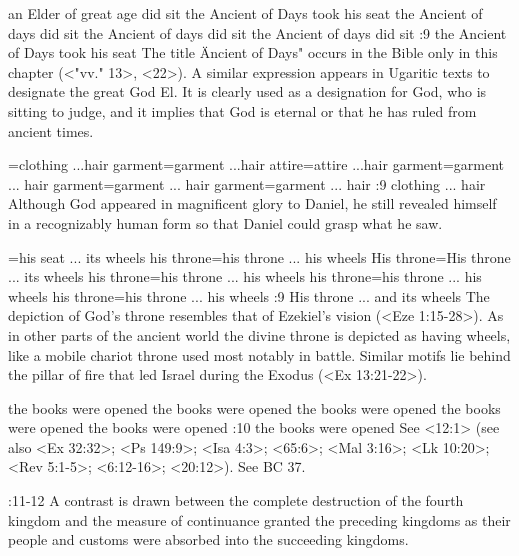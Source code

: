     {an Elder of great age did sit} %
    {the Ancient of Days took his seat} %
    {the Ancient of days did sit} %
    {the Ancient of days did sit} %
    {the Ancient of days did sit} %
:9 {the Ancient of Days took his seat} The title \"Ancient of Days" occurs in the Bible only in this chapter (<"vv." 13>, <22>). A similar 
expression appears in Ugaritic texts to designate the great God El. 
It is clearly used as a designation for God, who is sitting to judge, 
and it implies that God is eternal or that he has ruled from ancient 
times.

={clothing ...hair } %
    {garment}={garment ...hair } %
    {attire}={attire ...hair } %
    {garment}={garment ... hair} %
    {garment}={garment ... hair} %
    {garment}={garment ... hair} %
:9 {clothing ... hair} Although God appeared in magnificent 
glory to Daniel, he still revealed himself in a recognizably human 
form so that Daniel could grasp what he saw.

={his seat ... its wheels} %
    {his throne}={his throne ... his wheels} %
    {His throne}={His throne ... its wheels} %
    {his throne}={his throne ... his wheels} %
    {his throne}={his throne ... his wheels} %
    {his throne}={his throne ... his wheels} %
:9 {His throne ... and  its wheels} The depiction of God's throne resembles that of Ezekiel's
vision (<Eze 1:15-28>). As in  other parts of the ancient world the  
divine throne is depicted as having wheels, like a mobile chariot throne used most notably in
battle. Similar motifs lie behind the  pillar of fire that led Israel during the Exodus (<Ex 13:21-22>).

    {the books were opened} %
    {the books were opened} %
    {the books were opened} %
    {the books were opened} %
    {the books were opened} %
:10 {the books were opened} See <12:1> (see also <Ex 32:32>; <Ps 149:9>; <Isa 4:3>; <65:6>;
<Mal 3:16>; <Lk 10:20>; <Rev 5:1-5>; <6:12-16>; <20:12>). See BC 37.

:11-12 {}  A contrast is drawn between the complete
destruction of the fourth kingdom and the measure of continuance granted the preceding kingdoms as
their people and customs were absorbed into the succeeding kingdoms.

